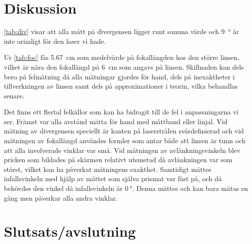 \documentclass[a4paper]{article}
\begin{document}
\FloatBarrier

\section{Diskussion}
  
\autoref{tab:div} visar att alla mått på divergensen ligger runt samma värde och \SI{9}{\degree} är inte orimligt för den laser vi hade.

Ur \autoref{tab:foc} fås \SI{5.67}{\centi\meter} som medelvärde på fokallängden hos den större linsen, vilket är nära den fokallängd på \SI{6}{\centi\meter} som angavs på linsen. Skillnaden kan dels bero på felmätning då alla mätningar gjordes för hand, dels på inexaktheter i tillverkningen av linsen samt dels på approximationer i teorin, vilka behandlas senare.
  
  
  
  

  Det finns ett flertal felkällor som kan ha bidragit till de fel i anpassningarna vi ser. Främst var alla avstånd mätta för hand med måttband eller linjal. Vid mätning av divergensen speciellt är kanten på laserstrålen svårdefinierad och vid mätningen av fokallängd användes formler som antar både att linsen är tunn och att alla involverade vinklar var små. Vid mätningen av avlänkningsvinkeln blev pricken som bildades på skärmen relativt utsmetad då avlänkningen var som störst, vilket kan ha påverkat mätningens exakthet. Samtidigt mättes infallsvinkeln med hjälp av måttet som själva prismat var fäst på, och då behövdes den vinkel då infallsvinkeln är $\SI{0}{\degree}$. Denna mättes och kan bara mätas en gång men påverkar alla andra vinklar.
  

\section{Slutsats/avslutning}
\end{document}
